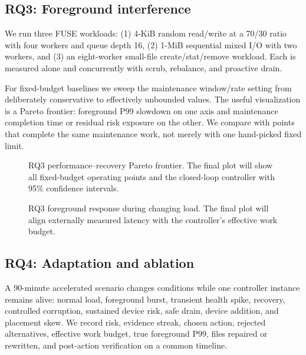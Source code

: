 
\subsection{RQ3: Foreground interference}
We run three FUSE workloads: (1) 4-KiB random read/write at a 70/30 ratio with four workers and queue depth 16, (2) 1-MiB sequential mixed I/O with two workers, and (3) an eight-worker small-file create/stat/remove workload. Each is measured alone and concurrently with scrub, rebalance, and proactive drain.

For fixed-budget baselines we sweep the maintenance window/rate setting from deliberately conservative to effectively unbounded values. The useful visualization is a Pareto frontier: foreground P99 slowdown on one axis and maintenance completion time or residual risk exposure on the other. We compare \autopilot{} with points that complete the same maintenance work, not merely with one hand-picked fixed limit.

\begin{figure}[t]
  \centering
  \caption{RQ3 performance--recovery Pareto frontier. The final plot will show all fixed-budget operating points and the closed-loop controller with 95\% confidence intervals.}
  \label{fig:rq3-pareto}
\end{figure}

\begin{figure}[t]
  \centering
  \caption{RQ3 foreground response during changing load. The final plot will align externally measured latency with the controller's effective work budget.}
  \label{fig:rq3-timeseries}
\end{figure}


\subsection{RQ4: Adaptation and ablation}
A 90-minute accelerated scenario changes conditions while one controller instance remains alive: normal load, foreground burst, transient health spike, recovery, controlled corruption, sustained device risk, safe drain, device addition, and placement skew. We record risk, evidence streak, chosen action, rejected alternatives, effective work budget, true foreground P99, files repaired or rewritten, and post-action verification on a common timeline.

